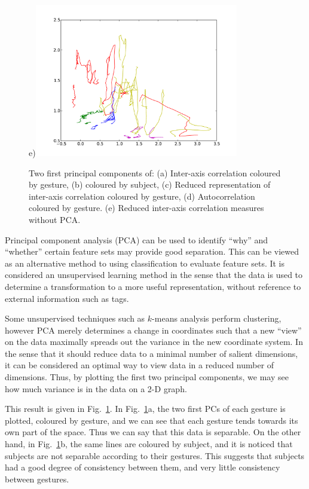 \documentclass{article}
\begin{document}
\begin{figure}
\centerline{
  e)\includegraphics[width=3.5in]{reduced_cor_by_gesture_lines.pdf}}
  \caption{Two first principal components of: (a) Inter-axis
    correlation coloured by gesture, (b) coloured by subject, (c)
    Reduced representation of inter-axis correlation coloured by
    gesture, (d) Autocorrelation coloured by gesture. (e) Reduced
    inter-axis correlation measures without PCA.}
\label{fig:pca}
\end{figure}

Principal component analysis (PCA) can be used to identify ``why'' and
``whether'' certain feature sets may provide good separation.
This can be viewed as an alternative method to using classification to
evaluate feature sets.
It is considered an unsupervised learning method in the sense that the
data is used to determine a transformation to a more useful
representation, without reference to external information such as
tags.

Some unsupervised techniques such as $k$-means analysis perform
clustering, however PCA merely determines a change in coordinates such
that a new ``view'' on the data maximally spreads out the variance in
the new coordinate system.
In the sense that it should reduce data to a minimal number of salient
dimensions, it can be considered an optimal way to view data in a
reduced number of dimensions.
Thus, by plotting the first two principal components, we may see how
much variance is in the data on a 2-D graph.

This result is given in Fig.~\ref{fig:pca}.
In Fig.~\ref{fig:pca}a, the two first PCs of each gesture is plotted,
coloured by gesture, and we can see that each gesture tends towards
its own part of the space.
Thus we can say that this data is separable.
On the other hand, in Fig.~\ref{fig:pca}b, the same lines are coloured
by subject, and it is noticed that subjects are not separable according
to their gestures.
This suggests that subjects had a good degree of consistency between
them, and very little consistency between gestures.
\end{document}
